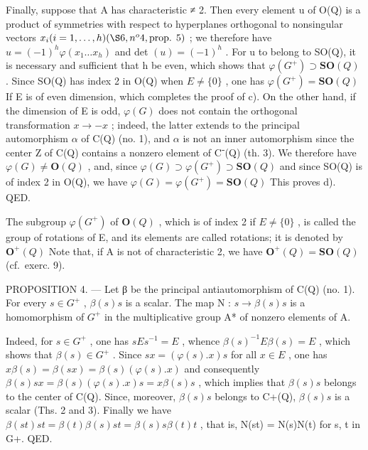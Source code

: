 Finally, suppose that A has characteristic ≠ 2. Then every element u of O(Q) is a product of symmetries with respect to hyperplanes orthogonal to nonsingular vectors \(x_{i} (i = 1, \ldots, h) (\S 6, n^{o} 4, \text{prop. } 5)\) ; we therefore have \(u = (-1)^{h} \varphi(x_{1} \ldots x_{h})\) and det \((u) = (-1)^{h}\) . For u to belong to SO(Q), it is necessary and sufficient that h be even, which shows that \(\varphi(G^{+}) \supset \mathbf{SO}(Q)\) . Since SO(Q) has index 2 in O(Q) when \(E \neq \{0\}\) , one has \(\varphi(G^{+}) = \mathbf{SO}(Q)\) If E is of even dimension, which completes the proof of c). On the other hand, if the dimension of E is odd, \(\varphi(G)\) does not contain the orthogonal transformation \(x \to -x\) ; indeed, the latter extends to the principal automorphism \(\alpha\) of C(Q) (no. 1), and \(\alpha\) is not an inner automorphism since the center Z of C(Q) contains a nonzero element of C⁻(Q) (th. 3). We therefore have \(\varphi(G) \neq \mathbf{O}(Q)\) , and, since \(\varphi(G) \supset \varphi(G^{+}) \supset \mathbf{SO}(Q)\) and since SO(Q) is of index 2 in O(Q), we have \(\varphi(G) = \varphi(G^{+}) = \mathbf{SO}(Q)\) This proves d). QED.

The subgroup \(\varphi(G^{+})\) of \(\mathbf{O}(Q)\) , which is of index 2 if \(E \neq \{0\}\) , is called the group of rotations of E, and its elements are called rotations; it is denoted by \(\mathbf{O}^{+}(Q)\) Note that, if A is not of characteristic 2, we have \(\mathbf{O}^{+}(Q) = \mathbf{S}\mathbf{O}(Q)\) (cf.~exerc. 9).

PROPOSITION 4. — Let β be the principal antiautomorphism of C(Q) (no. 1). For every \(s \in G^{+}\) , \(\beta(s)s\) is a scalar. The map N : \(s \to \beta(s)s\) is a homomorphism of \(G^{+}\) in the multiplicative group A* of nonzero elements of A.

Indeed, for \(s \in G^{+}\) , one has \(sEs^{-1} = E\) , whence \(\beta(s)^{-1}E\beta(s) = E\) , which shows that \(\beta(s) \in G^{+}\) . Since \(sx = (\varphi(s).x)s\) for all \(x \in E\) , one has \(x\beta(s) = \beta(sx) = \beta(s)(\varphi(s).x)\) and consequently \(\beta(s)sx = \beta(s)(\varphi(s).x)s = x\beta(s)s\) , which implies that \(\beta(s)s\) belongs to the center of C(Q). Since, moreover, \(\beta(s)s\) belongs to C+(Q), \(\beta(s)s\) is a scalar (Ths. 2 and 3). Finally we have \(\beta(st)st = \beta(t)\beta(s)st = \beta(s)s\beta(t)t\) , that is, N(st) = N(s)N(t) for s, t in G+. QED.

